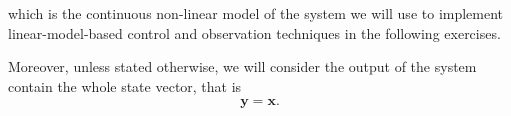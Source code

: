 	which is the continuous non-linear model of the system we will use to implement linear-model-based control and observation techniques in the following exercises. 
		
	Moreover, unless stated otherwise, we will consider the output of the system contain the whole state vector, that is
	\begin{align}
		\mathbf{y} = \mathbf{x}.
	\end{align}

	



